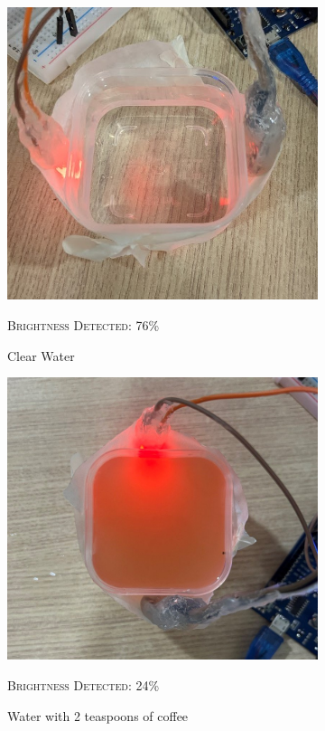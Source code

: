 \documentclass{article}
\begin{document}
\begin{figure}[H]
    \begin{subfigure}{.33\textwidth}
        \centering
        \includegraphics[width=0.8\linewidth]{report/images/clear_water.jpg}
        \caption{Clear Water}
        \textsc{Brightness Detected: 76\%}
    \end{subfigure}
    \begin{subfigure}{.33\textwidth}
        \centering
        \includegraphics[width=.8\linewidth]{report/images/murky_water_mediocre.jpg}
        \caption{Water with 2 teaspoons of coffee}
        \textsc{Brightness Detected: 24\%}
    \end{subfigure}
    \begin{subfigure}{.33\textwidth}

\end{subfigure}
\end{figure}
\end{document}
